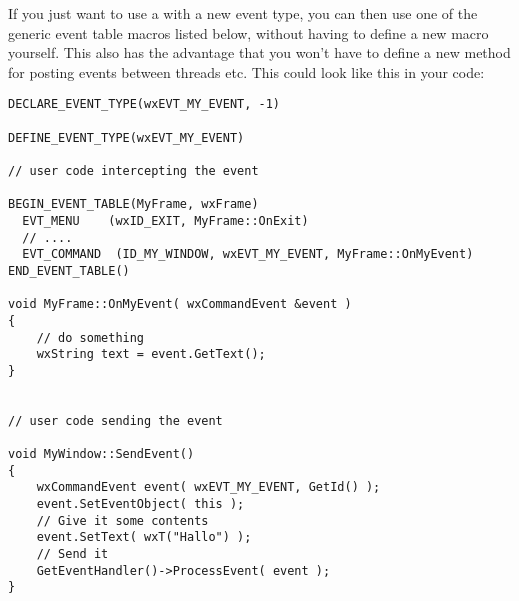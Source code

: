 
If you just want to use a  with
a new event type, you can then use one of the generic event table macros
listed below, without having to define a new macro yourself. This also
has the advantage that you won't have to define a new 
method for posting events between threads etc. This could look like this
in your code:

{\small%
\begin{verbatim}
DECLARE_EVENT_TYPE(wxEVT_MY_EVENT, -1)

DEFINE_EVENT_TYPE(wxEVT_MY_EVENT)

// user code intercepting the event

BEGIN_EVENT_TABLE(MyFrame, wxFrame)
  EVT_MENU    (wxID_EXIT, MyFrame::OnExit)
  // ....
  EVT_COMMAND  (ID_MY_WINDOW, wxEVT_MY_EVENT, MyFrame::OnMyEvent)
END_EVENT_TABLE()

void MyFrame::OnMyEvent( wxCommandEvent &event )
{
    // do something
    wxString text = event.GetText();
}


// user code sending the event

void MyWindow::SendEvent()
{
    wxCommandEvent event( wxEVT_MY_EVENT, GetId() );
    event.SetEventObject( this );
    // Give it some contents
    event.SetText( wxT("Hallo") );
    // Send it
    GetEventHandler()->ProcessEvent( event );
}
\end{verbatim}
}%



\twocolwidtha{8cm}%
\begin{twocollist}\itemsep=0pt
\end{twocollist}


